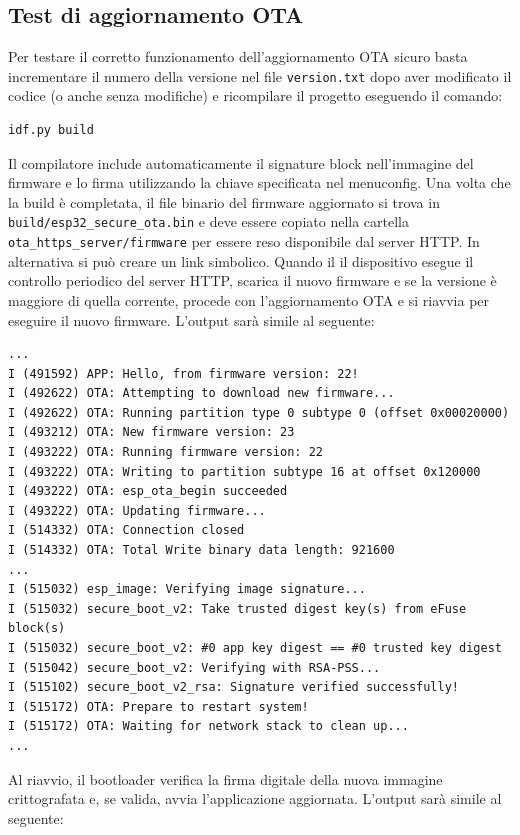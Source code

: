 \documentclass[a4paper]{article}
\begin{document}
\subsection{Test di aggiornamento OTA}
Per testare il corretto funzionamento dell'aggiornamento OTA sicuro basta
incrementare il numero della versione nel file \texttt{version.txt} dopo
aver modificato il codice (o anche senza modifiche) e ricompilare
il progetto eseguendo il comando:
\begin{lstlisting}
idf.py build
\end{lstlisting}
Il compilatore include automaticamente il signature block nell'immagine
del firmware e lo firma utilizzando la chiave specificata nel menuconfig.
Una volta che la build è completata, il file binario del firmware aggiornato
si trova in \texttt{build/esp32\_secure\_ota.bin} e deve essere copiato
nella cartella \texttt{ota\_https\_server/firmware} per essere reso disponibile
dal server HTTP. In alternativa si può creare un link simbolico. Quando il
il dispositivo esegue il controllo periodico del server HTTP, scarica
il nuovo firmware e se la versione è maggiore di quella corrente, procede
con l'aggiornamento OTA e si riavvia per eseguire il nuovo firmware.
L'output sarà simile al seguente:
\begin{lstlisting}[breaklines=false, basicstyle=\ttfamily\scriptsize]
...
I (491592) APP: Hello, from firmware version: 22!
I (492622) OTA: Attempting to download new firmware...
I (492622) OTA: Running partition type 0 subtype 0 (offset 0x00020000)
I (493212) OTA: New firmware version: 23
I (493222) OTA: Running firmware version: 22
I (493222) OTA: Writing to partition subtype 16 at offset 0x120000
I (493222) OTA: esp_ota_begin succeeded
I (493222) OTA: Updating firmware...
I (514332) OTA: Connection closed
I (514332) OTA: Total Write binary data length: 921600
...
I (515032) esp_image: Verifying image signature...
I (515032) secure_boot_v2: Take trusted digest key(s) from eFuse block(s)
I (515032) secure_boot_v2: #0 app key digest == #0 trusted key digest
I (515042) secure_boot_v2: Verifying with RSA-PSS...
I (515102) secure_boot_v2_rsa: Signature verified successfully!
I (515172) OTA: Prepare to restart system!
I (515172) OTA: Waiting for network stack to clean up...
...

\end{lstlisting}

\noindent
Al riavvio, il bootloader verifica la firma digitale della nuova immagine
crittografata e, se valida, avvia l'applicazione aggiornata.
L'output sarà simile al seguente:
\end{document}
